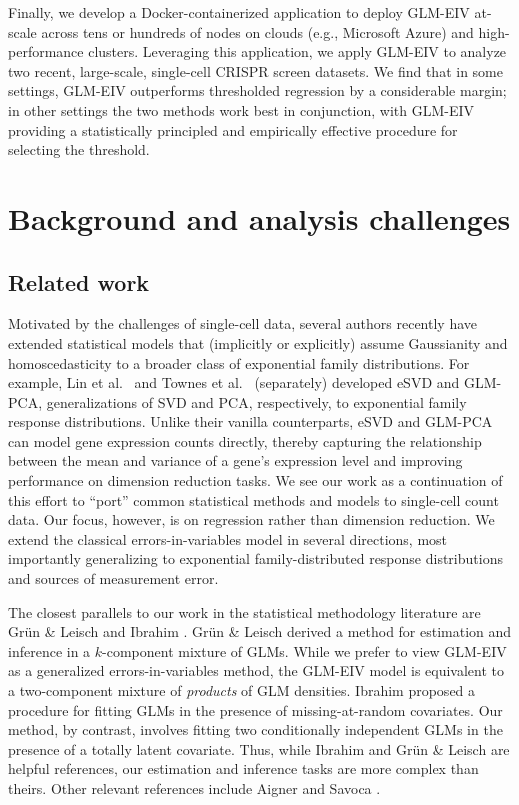 \documentclass[11pt]{article}
\begin{document}
Finally, we develop a Docker-containerized application to deploy GLM-EIV at-scale across tens or hundreds of nodes on clouds (e.g., Microsoft Azure) and high-performance clusters. Leveraging this application, we apply GLM-EIV to analyze two recent, large-scale, single-cell CRISPR screen datasets. We find that in some settings, GLM-EIV outperforms thresholded regression by a considerable margin; in other settings the two methods work best in conjunction, with GLM-EIV providing a statistically principled and empirically effective procedure for selecting the threshold.

\section{Background and analysis challenges}

\subsection{Related work}
Motivated by the challenges of single-cell data, several authors recently have extended statistical models that (implicitly or explicitly) assume Gaussianity and homoscedasticity to a broader class of exponential family distributions. For example, Lin et al.\ \cite{Lin2021} and Townes et al.\ \cite{Townes2019}  (separately) developed eSVD and GLM-PCA, generalizations of SVD and PCA, respectively, to exponential family response distributions. Unlike their vanilla counterparts, eSVD and GLM-PCA can model gene expression counts directly, thereby capturing the relationship between the mean and variance of a gene's expression level \cite{Lause2021} and improving performance on dimension reduction tasks. We see our work as a continuation of this effort to ``port'' common statistical methods and models to single-cell count data. Our focus, however, is on regression rather than dimension reduction. We extend the classical errors-in-variables model in several directions, most importantly generalizing to exponential family-distributed response distributions and sources of measurement error.

The closest parallels to our work in the statistical methodology literature are Gr\"{u}n \& Leisch \cite{Grun2008} and Ibrahim \cite{Ibrahim1990}. Gr\"{u}n \& Leisch derived a method for estimation and inference in a $k$-component mixture of GLMs. While we prefer to view GLM-EIV as a generalized errors-in-variables method,  the GLM-EIV model is equivalent to a two-component mixture of \textit{products} of GLM densities. Ibrahim proposed a procedure for fitting GLMs in the presence of missing-at-random covariates. Our method, by contrast, involves fitting two conditionally independent GLMs in the presence of a totally latent covariate. Thus, while Ibrahim and Gr\"{u}n \& Leisch are helpful references, our estimation and inference tasks are more complex than theirs. Other relevant references include Aigner \cite{Aigner1973} and Savoca \cite{Savoca2000}.
\end{document}
